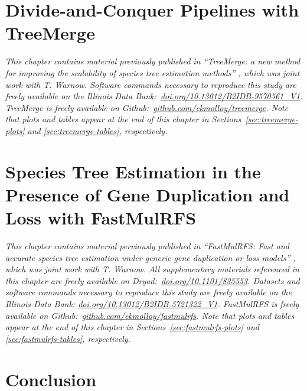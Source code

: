 \documentclass[tocnosub, noragright, centerchapter, fullpagesingle, 12pt]{uiuc_csthesis18}
\theoremstyle{definition}
\numberwithin{algocf}{chapter}     %
\begin{document}
\chapter{Divide-and-Conquer Pipelines with TreeMerge}
\label{chapter:treemerge}
\textit{This chapter contains material previously published in ``TreeMerge: a new method for improving the scalability of species tree estimation methods'' \cite{molloy2019treemerge}, which was joint work with T. Warnow.
Software commands necessary to reproduce this study are freely available on the Illinois Data Bank:~\href{https://doi.org/10.13012/B2IDB-9570561_V1}{doi.org/10.13012/B2IDB-9570561\_V1}.
\emph{TreeMerge} is freely available on Github:~\href{https://github.com/ekmolloy/treemerge}{github.com/ekmolloy/treemerge}.
Note that plots and tables appear at the end of this chapter in Sections~\ref{sec:treemerge-plots} and \ref{sec:treemerge-tables}, respectively.}



\chapter{Species Tree Estimation in the Presence of Gene Duplication and Loss with FastMulRFS}
\label{chapter:fastmulrfs}
{\em This chapter contains material perviously published in ``FastMulRFS: Fast and accurate species tree estimation under generic gene duplication or loss models'' \cite{molloy2020fastmulrfs}, which was joint work with T. Warnow.
All supplementary materials referenced in this chapter are freely available on Dryad:~\href{https://doi.org/10.1101/835553}{doi.org/10.1101/835553}.
Datasets and software commands necessary to reproduce this study are freely available on the Illinois Data Bank: \href{https://doi.org/10.13012/B2IDB-5721322_V1}{doi.org/10.13012/B2IDB-5721322\_V1}.
\emph{FastMulRFS} is freely available on Github:~\href{https://github.com/ekmolloy/fastmulrfs}{github.com/ekmolloy/fastmulrfs}.
Note that plots and tables appear at the end of this chapter in Sections~\ref{sec:fastmulrfs-plots} and \ref{sec:fastmulrfs-tables}, respectively.}



\chapter{Conclusion}
\label{chapter:conclusion}


%



%
\appendix

\printnoidxglossary[type = \acronymtype, title={LIST OF ACRONYMS}]  %
\printnoidxglossary[title={LIST OF TERMS}]   %

\backmatter
\end{document}
